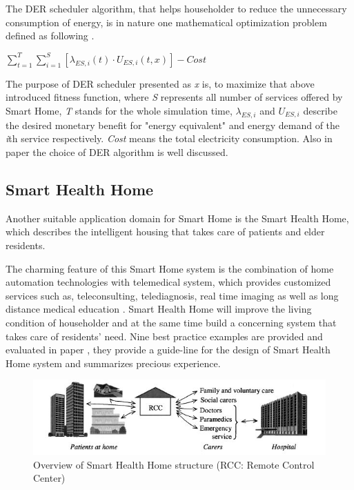 The DER scheduler algorithm, that helps householder to reduce the unnecessary consumption of energy, is in nature one mathematical optimization problem defined as following \cite{smart_home_for_energy}.
\begin{center}
 $ \sum_{t=1}^{T}\sum_{i=1}^{S}[\lambda_{ES,i}(t)\cdot {U_{ES,i}}(t,x)]-Cost$
\end{center}

The purpose of DER scheduler presented as \emph{x} is, to maximize that above introduced fitness function, where \emph{S} represents all number of services offered by Smart Home, \emph{T} stands for the whole simulation time, $\lambda_{ES,i}$ and $ U_{ES,i}$ describe the desired monetary benefit for "energy equivalent" and energy demand of the \emph{i}th service respectively. \emph{Cost} means the total electricity consumption. Also in paper \cite{smart_home_for_energy} the choice of DER algorithm is well discussed.


\subsection{Smart Health Home}
Another suitable application domain for Smart Home is the Smart Health Home, which describes the intelligent housing that takes care of patients and elder residents.

The charming feature of this Smart Home system is the combination of home automation technologies with telemedical system, which provides customized services such as, teleconsulting, telediagnosis, real time imaging as well as long distance medical education \cite{smart_home_for_health}. Smart Health Home will improve the living condition of householder and at the same time build a concerning system that takes care of residents' need. Nine best practice examples are provided and evaluated in paper \cite{smart_home_for_old}, they provide a guide-line for the design of Smart Health Home system and summarizes precious experience. 
 \begin{figure}[!htbp]
	\centering
	\includegraphics[width=1.0\textwidth]{rcc.jpg}
		\caption{Overview of Smart Health Home structure \cite{smart_home_for_health} (RCC: Remote Control Center)}
	\label{fig:rcc}
\end{figure}
